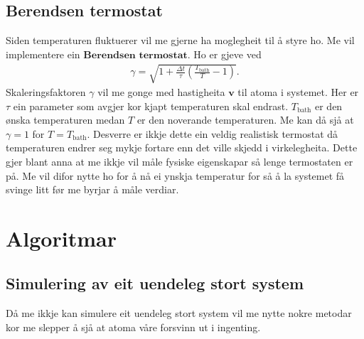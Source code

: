 \documentclass[12pt, a4paper]{article}
\theoremstyle{definition}
\newcommand{\vb}{\mathbf}
\begin{document}
    \subsection*{Berendsen termostat}
        Siden temperaturen fluktuerer vil me gjerne ha moglegheit til å styre ho. Me vil implementere ein $\textbf{Berendsen termostat}$. Ho er gjeve ved 
        \begin{align*}
            \gamma = \sqrt{1 + \frac{\Delta t}{\tau}\left( \frac{T_{\text{bath}}}{T} - 1 \right)}.
        \end{align*}
        Skaleringsfaktoren $\gamma$ vil me gonge med hastigheita $\vb{v}$ til atoma i systemet. Her er $\tau$ ein parameter som avgjer kor kjapt temperaturen skal endrast.
        $T_{\text{bath}}$ er den ønska temperaturen medan $T$ er den noverande temperaturen. Me kan då sjå at $\gamma = 1$ for $T = T_{\text{bath}}$. Desverre er ikkje dette
        ein veldig realistisk termostat då temperaturen endrer seg mykje fortare enn det ville skjedd i virkelegheita. Dette gjer blant anna at me ikkje vil måle fysiske eigenskapar
        så lenge termostaten er på. Me vil difor nytte ho for å nå ei ynskja temperatur for så å la systemet få svinge litt før me byrjar å måle verdiar.


\newpage


\section*{Algoritmar}

    \subsection*{Simulering av eit uendeleg stort system}
        Då me ikkje kan simulere eit uendeleg stort system vil me nytte nokre metodar kor me slepper å sjå at atoma våre forsvinn ut i ingenting.
\end{document}
